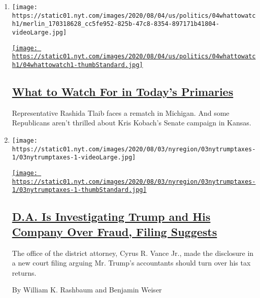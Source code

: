 \begin{enumerate}
\def\labelenumi{\arabic{enumi}.}
\item
  \texttt{[image: https://static01.nyt.com/images/2020/08/04/us/politics/04whattowatch1/merlin\_170318628\_cc5fe952-825b-47c8-8354-897171b41804-videoLarge.jpg]}

  \href{/2020/08/04/us/elections/primary-election-michigan-arizona-kansas.html}{\texttt{[image: https://static01.nyt.com/images/2020/08/04/us/politics/04whattowatch1/04whattowatch1-thumbStandard.jpg]}}

  \hypertarget{what-to-watch-for-in-todays-primaries}{%
  \subsection{\texorpdfstring{\href{/2020/08/04/us/elections/primary-election-michigan-arizona-kansas.html}{What
  to Watch For in Today's
  Primaries}}{What to Watch For in Today's Primaries}}\label{what-to-watch-for-in-todays-primaries}}

  Representative Rashida Tlaib faces a rematch in Michigan. And some
  Republicans aren't thrilled about Kris Kobach's Senate campaign in
  Kansas.
\item
  \texttt{[image: https://static01.nyt.com/images/2020/08/03/nyregion/03nytrumptaxes-1/03nytrumptaxes-1-videoLarge.jpg]}

  \href{/2020/08/03/nyregion/donald-trump-taxes-cyrus-vance.html}{\texttt{[image: https://static01.nyt.com/images/2020/08/03/nyregion/03nytrumptaxes-1/03nytrumptaxes-1-thumbStandard.jpg]}}

  \hypertarget{da-is-investigating-trump-and-his-company-over-fraud-filing-suggests}{%
  \subsection{\texorpdfstring{\href{/2020/08/03/nyregion/donald-trump-taxes-cyrus-vance.html}{D.A.
  Is Investigating Trump and His Company Over Fraud, Filing
  Suggests}}{D.A. Is Investigating Trump and His Company Over Fraud, Filing Suggests}}\label{da-is-investigating-trump-and-his-company-over-fraud-filing-suggests}}

  The office of the district attorney, Cyrus R. Vance Jr., made the
  disclosure in a new court filing arguing Mr. Trump's accountants
  should turn over his tax returns.

  By William K. Rashbaum and Benjamin Weiser
\end{enumerate}

